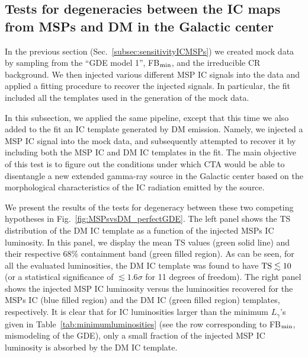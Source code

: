 \documentclass[doublespace,nopageskip]{VTthesis} %
\begin{document}
\subsection{Tests for degeneracies between the IC maps from MSPs and DM in the Galactic center}
\label{subsec:degeneracyDMvsMSPs}

In the previous section (Sec.~\ref{subsec:sensitivityICMSPs}) we created mock data by sampling from the  ``GDE model 1'', FB$_{\rm min}$, and the irreducible CR background. We then injected various different MSP IC signals into the data and applied a fitting procedure to recover the injected signals. In particular, the fit included all the templates used in the generation of the mock data. 

In this subsection, we applied the same pipeline, except that this time we also added to the fit an IC template generated by DM emission. Namely, we injected a MSP IC signal into the mock data, and subsequently attempted to recover it by including both the MSP IC and DM IC templates in the fit. The main objective of this test is to figure out the conditions under which CTA would be able to disentangle a new extended gamma-ray source in the Galactic center based on the morphological characteristics of the IC radiation emitted by the source.

We present the results of the tests for degeneracy between these two competing hypotheses in Fig.~\ref{fig:MSPsvsDM_perfectGDE}. The left panel shows the TS distribution of the DM IC template as a function of the injected MSPs IC luminosity. In this panel, we display the mean TS values (green solid line) and their respective 68\% containment band (green filled region). As can be seen, for all the evaluated luminosities, the DM IC template was found to have ${\rm TS}\lesssim 10$ (or a statistical significance of $\lesssim 1.6\sigma$ for 11 degrees of freedom). The right panel shows the injected MSP IC luminosity versus the luminosities recovered for the MSPs IC (blue filled region) and the DM IC (green filled region) templates, respectively. It is clear that for IC luminosities larger than the minimum $L_{\gamma}$'s given in Table~\ref{tab:minimumluminosities} (see the row corresponding to FB$_{\rm min}$, mismodeling of the GDE), only a small fraction of the injected MSP IC luminosity is absorbed by the DM IC template.
\end{document}
